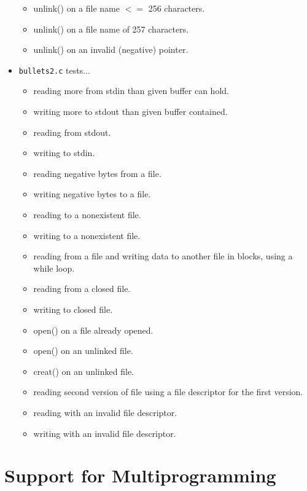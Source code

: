 \documentclass{article}
\begin{document}
\begin{itemize}
\begin{itemize}
\item unlink() on a file name $<=$ 256 characters.
\item unlink() on a file name of 257 characters.
\item unlink() on an invalid (negative) pointer.
\end{itemize}
\item \texttt{bullets2.c} tests... \begin{itemize}
\item reading more from stdin than given buffer can hold.
\item writing more to stdout than given buffer contained.
\item reading from stdout.
\item writing to stdin.
\item reading negative bytes from a file.
\item writing negative bytes to a file.
\item reading to a nonexistent file.
\item writing to a nonexistent file.
\item reading from a file and writing data to another file in blocks, using a while loop.
\item reading from a closed file.
\item writing to closed file.
\item open() on a file already opened.
\item open() on an unlinked file.
\item creat() on an unlinked file.
\item reading second version of file using a file descriptor for the first version.
\item reading with an invalid file descriptor.
\item writing with an invalid file descriptor.
\end{itemize}
\end{itemize}

\section{Support for Multiprogramming}
\end{document}
